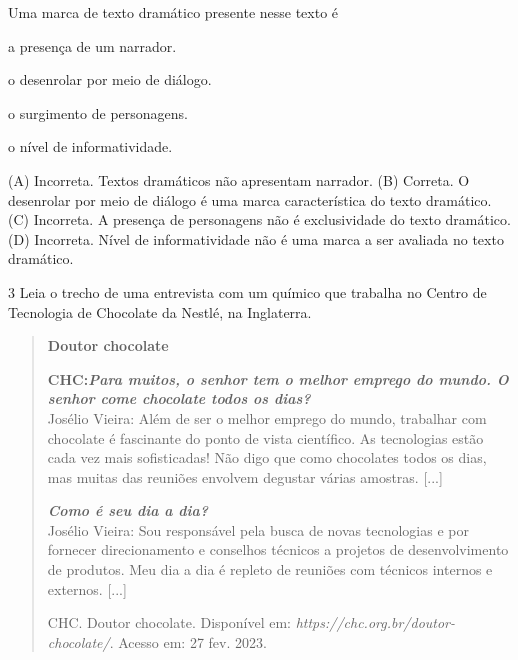 Uma marca de texto dramático presente nesse texto é

\begin{escolha}
\item a presença de um narrador.

\item o desenrolar por meio de diálogo.

\item o surgimento de personagens.

\item o nível de informatividade.
\end{escolha}


(A) Incorreta. Textos dramáticos não apresentam narrador.
(B) Correta. O desenrolar por meio de diálogo é uma marca característica do texto dramático.
(C) Incorreta. A presença de personagens não é exclusividade do texto dramático.
(D) Incorreta. Nível de informatividade não é uma marca a ser avaliada no texto dramático.

\num{3} Leia o trecho de uma entrevista com um químico que
trabalha no Centro de Tecnologia de Chocolate da Nestlé, na Inglaterra.

\begin{quote}
\textbf{Doutor chocolate}

\textbf{CHC:\emph{Para muitos, o senhor tem o melhor emprego do mundo.
O senhor come chocolate todos os dias?}}\\
Josélio Vieira: Além de ser o melhor emprego do mundo, trabalhar com
chocolate é fascinante do ponto de vista científico. As tecnologias
estão cada vez mais sofisticadas! Não digo que como chocolates todos os
dias, mas muitas das reuniões envolvem degustar várias amostras.
{[}...{]}

\emph{\textbf{Como é seu dia a dia?}}\\
Josélio Vieira: Sou responsável pela busca de novas tecnologias e por fornecer
direcionamento e conselhos técnicos a projetos de desenvolvimento de
produtos. Meu dia a dia é repleto de reuniões com técnicos internos e
externos. {[}...{]}

CHC. Doutor chocolate. Disponível em:
\emph{https://chc.org.br/doutor-chocolate/}. Acesso em: 27 fev. 2023.
\end{quote}

